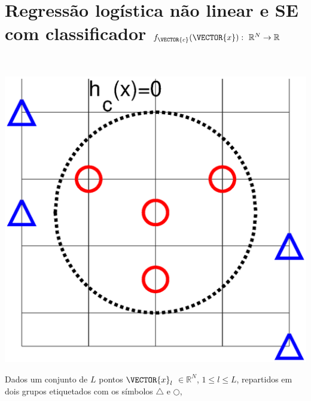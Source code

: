\newpage

\section{Regressão logística não linear e SE com classificador $f_{\VECTOR{c}}(\VECTOR{x}):~\mathbb{R}^{N} \rightarrow \mathbb{R}$}
\label{sec:theo:reglogrnr1nolinear:1}


\begin{theorem}\label{theo:reglogrnr1nolinear:1}
~\\
\noindent
\begin{minipage}{0.45\textwidth}
\centering
\includegraphics[width=0.95\linewidth]{chapters/classificacao/mfiles/reglogrnr1nolinear/reglogrnr1nolinear.eps} 
\end{minipage}
\begin{minipage}{0.55\textwidth}
Dados um conjunto de $L$ pontos
$\VECTOR{x}_l$ $\in \mathbb{R}^{N}$, $1\leq l \leq L$,
repartidos em dois grupos etiquetados com os símbolos $\bigtriangleup$ e $\bigcirc$,

\end{minipage}
\end{theorem}
